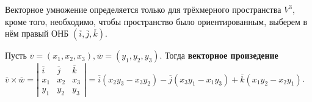   
	  Векторное умножение определяется только для трёхмерного пространства $V^3$, кроме того, необходимо, чтобы пространство было ориентированным, выберем в нём правый ОНБ $(\overline{i}, \overline{j}, \overline{k})$.
	  
	  \begin{figure*}[h]
		  \centering
		  \def\svgwidth{0.2\columnwidth}
		  
	  \end{figure*}
	  \begin{Def}
		  Пусть $\overline{v} = (x_1, x_2, x_3), \overline{w} = (y_1, y_2, y_3)$. Тогда \textbf{векторное произедение} \\
		  $\overline{v} \times \overline{w} = \left|\begin{array}{cccc}
			  \overline{i} & \overline{j} & \overline{k} \\ 
			  x_1 & x_2 & x_3 \\ 
			  y_1 & y_2 & y_3
			  \end{array}\right| = \overline{i}(x_2 y_3 - x_3y_2) - \overline{j}(x_3 y_1 - x_1 y_3) + \overline{k}(x_1 y_2 - x_2 y_1)$.
	  \end{Def}
	  
